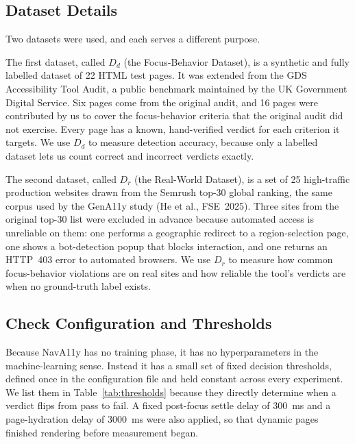 \subsection{Dataset Details}
\label{subsec:datasets}
Two datasets were used, and each serves a different purpose.

The first dataset, called $D_d$ (the Focus-Behavior Dataset), is a synthetic and fully
labelled dataset of 22 HTML test pages. It was extended from the GDS Accessibility Tool
Audit, a public benchmark maintained by the UK Government Digital Service. Six pages come
from the original audit, and 16 pages were contributed by us to cover the focus-behavior
criteria that the original audit did not exercise. Every page has a known, hand-verified
verdict for each criterion it targets. We use $D_d$ to measure detection accuracy, because
only a labelled dataset lets us count correct and incorrect verdicts exactly.

The second dataset, called $D_r$ (the Real-World Dataset), is a set of 25 high-traffic
production websites drawn from the Semrush top-30 global ranking, the same corpus used by
the GenA11y study (He et al., FSE~2025). Three sites from the original top-30 list were
excluded in advance because automated access is unreliable on them: one performs a
geographic redirect to a region-selection page, one shows a bot-detection popup that blocks
interaction, and one returns an HTTP~403 error to automated browsers. We use $D_r$ to
measure how common focus-behavior violations are on real sites and how reliable the tool's
verdicts are when no ground-truth label exists.

\subsection{Check Configuration and Thresholds}
Because NavA11y has no training phase, it has no hyperparameters in the machine-learning
sense. Instead it has a small set of fixed decision thresholds, defined once in the
configuration file and held constant across every experiment. We list them in
Table~\ref{tab:thresholds} because they directly determine when a verdict flips from pass
to fail. A fixed post-focus settle delay of \SI{300}{\milli\second} and a page-hydration
delay of \SI{3000}{\milli\second} were also applied, so that dynamic pages finished
rendering before measurement began.

